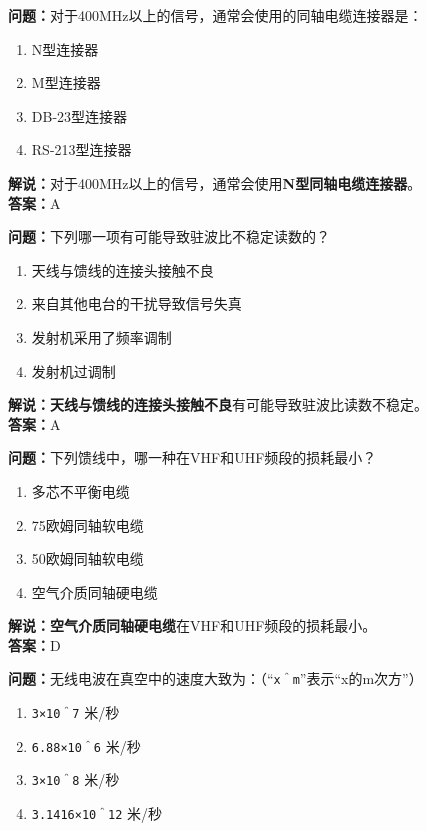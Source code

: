 \documentclass{ctexbook}
\begin{document}
\bigskip


\noindent\textbf{问题：}对于400MHz以上的信号，通常会使用的同轴电缆连接器是：

\begin{enumerate}[label=\Alph*), leftmargin=3em]
	\item N型连接器
	\item M型连接器
	\item DB-23型连接器
	\item RS-213型连接器
\end{enumerate}

\noindent\textbf{解说：}对于400MHz以上的信号，通常会使用\textbf{N型同轴电缆连接器}。\\\noindent\textbf{答案：}A


\bigskip


\noindent\textbf{问题：}下列哪一项有可能导致驻波比不稳定读数的？

\begin{enumerate}[label=\Alph*), leftmargin=3em]
	\item 天线与馈线的连接头接触不良
	\item 来自其他电台的干扰导致信号失真
	\item 发射机采用了频率调制
	\item 发射机过调制
\end{enumerate}

\noindent\textbf{解说：}\textbf{天线与馈线的连接头接触不良}有可能导致驻波比读数不稳定。\\\noindent\textbf{答案：}A


\bigskip


\noindent\textbf{问题：}下列馈线中，哪一种在VHF和UHF频段的损耗最小？

\begin{enumerate}[label=\Alph*), leftmargin=3em]
	\item 多芯不平衡电缆
	\item 75欧姆同轴软电缆
	\item 50欧姆同轴软电缆
	\item 空气介质同轴硬电缆
\end{enumerate}

\noindent\textbf{解说：}\textbf{空气介质同轴硬电缆}在VHF和UHF频段的损耗最小。\\\noindent\textbf{答案：}D


\bigskip


\noindent\textbf{问题：}无线电波在真空中的速度大致为：（“\texttt{x＾m}”表示“x的m次方”）

\begin{enumerate}[label=\Alph*), leftmargin=3em]
	\item \texttt{3×10＾7} 米/秒
	\item \texttt{6.88×10＾6} 米/秒
	\item \texttt{3×10＾8} 米/秒
	\item \texttt{3.1416×10＾12} 米/秒
\end{enumerate}
\end{document}
